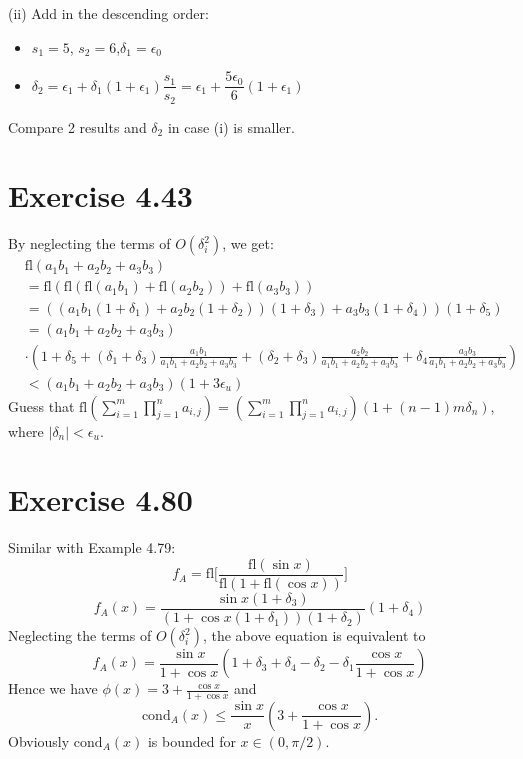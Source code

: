 \documentclass[a4paper]{article}
\begin{document}
(ii) Add in the descending order:
\begin{itemize}
  \item $s_1 = 5$, $s_2 = 6$,$\delta_1 = \epsilon_0$
  \item $\delta_2 = \epsilon_1 + \delta_1(1 + \epsilon_1)\dfrac{s_1}{s_2} = \epsilon_1 + \dfrac{5\epsilon_0}{6}(1 + \epsilon_1)$
\end{itemize}
Compare 2 results and $\delta_2$ in case (i) is smaller.

\section*{Exercise 4.43}
By neglecting the terms of $O(\delta_i^2)$, we get:
\begin{align*}
  &\text{fl}(a_1 b_1 + a_2 b_2 + a_3 b_3) \\
  &= \text{fl}(\text{fl}(\text{fl}(a_1 b_1) + \text{fl}(a_2 b_2)) + \text{fl}(a_3 b_3)) \\
  &= ((a_1 b_1(1+\delta_1) + a_2 b_2(1+\delta_2))(1 + \delta_3) + a_3 b_3(1 + \delta_4))(1 + \delta_5) \\
  &= (a_1 b_1 + a_2 b_2 + a_3 b_3)\\
  &\cdot(1+\delta_5 + (\delta_1 + \delta_3)\frac{a_1 b_1}{a_1 b_1 + a_2 b_2 + a_3 b_3} + (\delta_2 + \delta_3)\frac{a_2 b_2}{a_1 b_1 + a_2 b_2 + a_3 b_3} + \delta_4\frac{a_3 b_3}{a_1 b_1 + a_2 b_2 + a_3 b_3}) \\
  &< (a_1 b_1 + a_2 b_2 + a_3 b_3)(1 + 3\epsilon_u)
\end{align*}
Guess that $\text{fl}(\sum_{i=1}^{m}\prod_{j=1}^{n}a_{i,j}) = (\sum_{i=1}^{m}\prod_{j=1}^{n}a_{i,j})(1 + (n-1)m\delta_n)$, where $|\delta_n| < \epsilon_u$.




\section*{Exercise 4.80}
Similar with Example 4.79:
$$
f_A = \text{fl}\Big[\frac{\text{fl}(\sin x)}{\text{fl}(1 + \text{fl}(\cos x))}\Big]
$$
$$
f_A(x) = \frac{\sin x(1 + \delta_3)}{(1 + \cos x(1 + \delta_1))(1 + \delta_2)}(1 + \delta_4)
$$
Neglecting the terms of $O(\delta_i^2)$, the above equation is equivalent to
$$
f_A(x) = \frac{\sin x}{1 + \cos x}(1 + \delta_3 + \delta_4 - \delta_2 - \delta_1\frac{\cos x}{1 + \cos x})
$$
Hence we have $\phi(x) = 3 + \frac{\cos x}{1 + \cos x}$ and
$$
\text{cond}_A(x) \leq \frac{\sin x}{x}(3 + \frac{\cos x}{1 + \cos x}).
$$
Obviously $\text{cond}_A(x)$ is bounded for $x \in (0,\pi/2)$.
\end{document}
